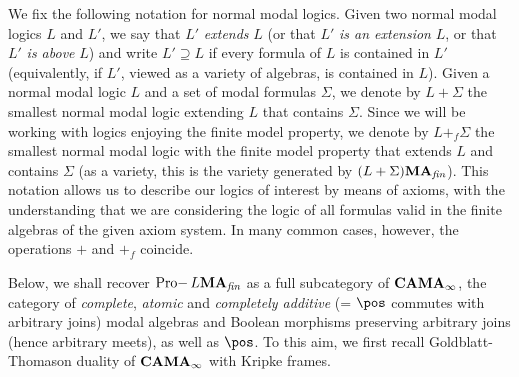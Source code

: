 \documentclass{article}
\theoremstyle{definition}
\DeclareMathOperator{\Pro}{Pro-}
\newcommand{\MA}{\textup{\textbf{MA}}}
\newcommand{\CAMA}{\textup{\textbf{CAMA}}}
\newcommand{\fin}{\textit{fin}}
\begin{document}
We fix the following notation for normal modal logics. Given two normal modal logics $L$ and $L'$, we say that $L'$ \emph{extends} $L$ (or that $L'$ \emph{is an extension} $L$, or that $L'$ \emph{is above} $L$) and write $L' \supseteq L$ if every formula of $L$ is contained in $L'$ (equivalently, if $L'$, viewed as a variety of algebras, is contained in $L$). Given a normal modal logic $L$ and a set of modal formulas $\Sigma$, we denote by $L + \Sigma$ the smallest normal modal logic extending $L$ that contains $\Sigma$. Since we will be working with logics enjoying the finite model property, we denote by $L +_f \Sigma$ the smallest normal modal logic with the finite model property that extends $L$ and contains $\Sigma$
(as a variety, this is the variety generated by $(L+\Sigma)\MA_\fin$).
This notation allows us to describe our logics of interest by means of axioms, with the understanding that we are considering the logic of all formulas valid in the finite algebras of the given axiom system. In many 
common cases, however, the operations $+$ and $+_f$  coincide.

Below, we shall recover $\Pro L\MA_\fin$ %
as a full subcategory of $\CAMA_\infty$, the category of \emph{complete}, \emph{atomic} and \emph{completely additive} (= $\pos$ commutes with arbitrary joins) modal algebras and Boolean morphisms preserving arbitrary joins (hence arbitrary meets), as well as $\pos$. To this aim, we first recall Goldblatt-Thomason duality of $\CAMA_\infty$ with Kripke frames.


\end{document}
